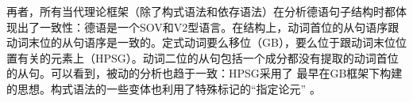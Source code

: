 再者，所有当代理论框架（除了构式语法和依存语法）在分析德语句子结构时都体现出了一致性：德语是一个SOV和V2型语言。在结构上，动词首位的从句语序跟动词末位的从句语序是一致的。定式动词要么移位（GB），要么位于跟动词末位位置有关的元素上（HPSG）。动词二位的从句包括一个成分都没有提取的动词首位的从句。可以看到，被动的分析也趋于一致：HPSG采用了 \citet{Haider84b,Haider85b,Haider86}最早在GB框架下构建的思想。构式语法的一些变体也利用了特殊标记的“指定论元” \citep[--57]{MR2001a}。

